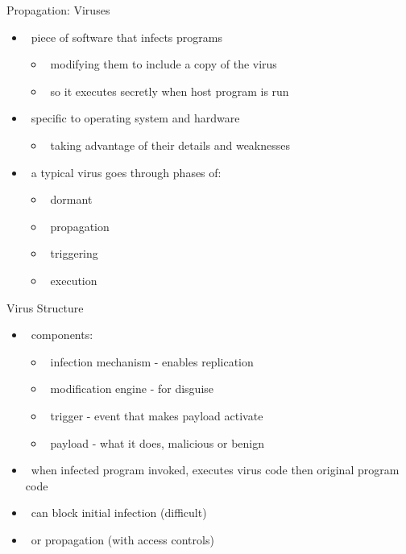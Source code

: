 \documentclass{beamer}
\begin{document}
\begin{frame}{Propagation: Viruses }
  \begin{itemize}
  \item  piece of software that infects programs 
    \begin{itemize}
    \item  modifying them to include a copy of the virus 
    \item  so it executes secretly when host program is run 
    \end{itemize}
  \item  specific to operating system and hardware 
    \begin{itemize}
    \item  taking advantage of their details and weaknesses 
    \end{itemize}
  \item  a typical virus goes through phases of: 
    \begin{itemize}
    \item  dormant 
    \item  propagation 
    \item  triggering 
    \item  execution
    \end{itemize}
  \end{itemize}
\end{frame}

\begin{frame}{Virus Structure }
  \begin{itemize}
  \item  components: 
    \begin{itemize}
    \item  infection mechanism - enables replication 
    \item  modification engine - for disguise 
    \item  trigger - event that makes payload activate 
    \item  payload - what it does, malicious or benign 
    \end{itemize}
  \item  when infected program invoked, executes 
    virus code then original program code 
  \item  can block initial infection (difficult)‏ 
  \item  or propagation (with access controls)
  \end{itemize}
\end{frame}
\end{document}
